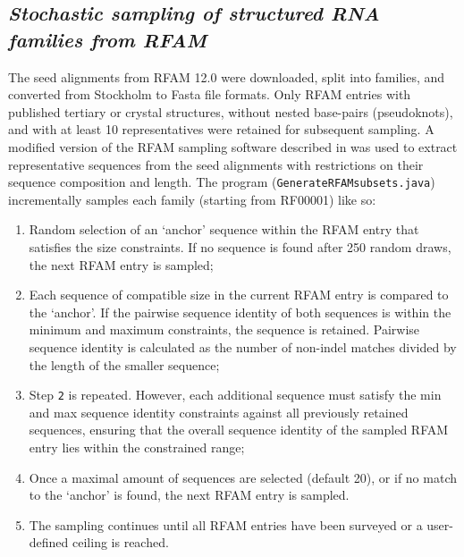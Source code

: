 \documentclass[a4paper,twoside]{article}
\begin{document}
\subsection{\textit{Stochastic sampling of structured RNA families from RFAM}}
The seed alignments from RFAM 12.0 were downloaded, split into families, and converted from Stockholm
to Fasta file formats. Only RFAM entries with published tertiary or crystal structures, without nested base-pairs 
(pseudoknots), and with at least 10 representatives were retained for subsequent sampling. A modified version 
of the RFAM sampling software described in  \cite{smith2013widespread} was used to extract representative 
sequences from the seed alignments with restrictions on their sequence composition and length. The program
(\texttt{GenerateRFAMsubsets.java}) incrementally samples each family (starting from RF00001) like so:

\begin{enumerate}
\item Random selection of an `anchor'  sequence within the RFAM entry that satisfies the size constraints. 
If no sequence is found after 250 random draws, the next RFAM entry is sampled;

\item  Each sequence of compatible size in the current RFAM entry is compared to the `anchor'. 
If the pairwise sequence identity of both sequences is within the minimum and maximum constraints, 
the sequence is retained. Pairwise sequence identity is calculated as the number of non-indel matches 
divided by the length of the smaller sequence; 

\item Step \texttt{2} is repeated. However, each  additional sequence must satisfy the min and max sequence 
identity constraints  against all previously retained sequences, ensuring that the overall sequence identity of the sampled 
RFAM entry lies within the constrained range; 

\item Once a maximal amount of sequences are selected (default 20), or if no match to the `anchor' is found, 
the next RFAM entry is sampled. 

\item The sampling continues until all RFAM entries have been surveyed or a user-defined ceiling is reached. 

\end{enumerate}
\end{document}
